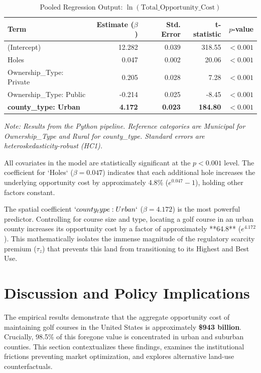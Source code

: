 \documentclass[10pt, letterpaper]{article}
\begin{document}
\begin{table}[h!]
\centering
\caption{Pooled Regression Output: $\ln(\text{Total\_Opportunity\_Cost})$}
\label{tab:regression}
\renewcommand{\arraystretch}{1.2}
\begin{tabular}{l r r r r}
\toprule
\textbf{Term} & \textbf{Estimate ($\beta$)} & \textbf{Std. Error} & \textbf{t-statistic} & \textbf{$p$-value} \\
\midrule
(Intercept) & 12.282 & 0.039 & 318.55 & $< 0.001$ \\
Holes & 0.047 & 0.002 & 20.06 & $< 0.001$ \\
Ownership\_Type: Private & 0.205 & 0.028 & 7.28 & $< 0.001$ \\
Ownership\_Type: Public & -0.214 & 0.025 & -8.45 & $< 0.001$ \\
\textbf{county\_type: Urban} & \textbf{4.172} & \textbf{0.023} & \textbf{184.80} & \textbf{$< 0.001$} \\
\bottomrule
\end{tabular}
\justify
\footnotesize{\textit{Note: Results from the Python pipeline. Reference categories are Municipal for Ownership\_Type and Rural for county\_type. Standard errors are heteroskedasticity-robust (HC1).}}
\end{table}

All covariates in the model are statistically significant at the $p < 0.001$ level. The coefficient for `Holes` ($\beta = 0.047$) indicates that each additional hole increases the underlying opportunity cost by approximately 4.8\% ($e^{0.047} - 1$), holding other factors constant.

The spatial coefficient $`county_type: Urban`$ ($\beta = 4.172$) is the most powerful predictor. Controlling for course size and type, locating a golf course in an urban county increases its opportunity cost by a factor of approximately **64.8** ($e^{4.172}$). This mathematically isolates the immense magnitude of the regulatory scarcity premium ($\tau_z$) that prevents this land from transitioning to its Highest and Best Use.

\newpage

\section{Discussion and Policy Implications}

The empirical results demonstrate that the aggregate opportunity cost of maintaining golf courses in the United States is approximately \textbf{\$943 billion}. Crucially, 98.5\% of this foregone value is concentrated in urban and suburban counties. This section contextualizes these findings, examines the institutional frictions preventing market optimization, and explores alternative land-use counterfactuals.
\end{document}
